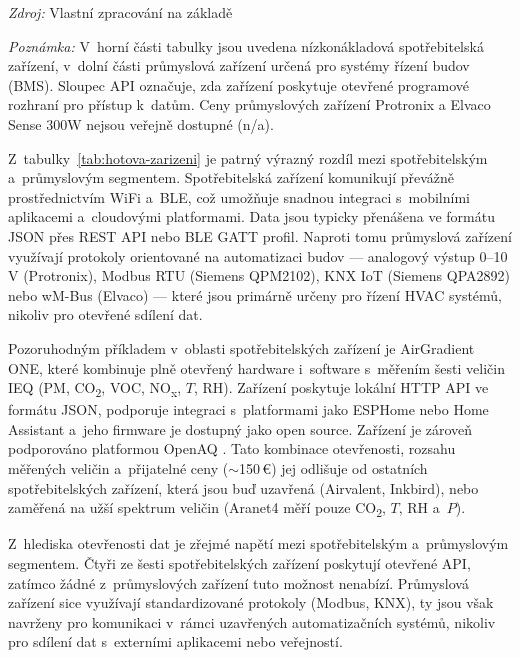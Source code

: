 {  \footnotesize \textit{Zdroj:} Vlastní zpracování na základě \parencite{Aranet4HOMEIndoor, PremiumBlackAirvalent, INKBIRDWireless4in1, protronixs.r.o.CidloNLECOCO2Cidla2020, protronixs.r.o.CidloNLECOTVOCCidla2020, siemensSensorOverviewBrochure2024, 2kshopsSiemensQPM2102MO2025, alpha-omegatechnologygmbh&co.ElvacoSense100W2025, alpha-omegatechnologygmbh&co.ElvacoSense300W2025, API}

  \footnotesize \textit{Poznámka:} V~horní části tabulky jsou uvedena nízkonákladová spotřebitelská zařízení, v~dolní části průmyslová zařízení určená pro systémy řízení budov (BMS). Sloupec API označuje, zda zařízení poskytuje otevřené programové rozhraní pro přístup k~datům. Ceny průmyslových zařízení Protronix a Elvaco Sense 300W nejsou veřejně dostupné (n/a).
}

Z~tabulky~\ref{tab:hotova-zarizeni} je patrný výrazný rozdíl mezi spotřebitelským a~průmyslovým segmentem. Spotřebitelská zařízení komunikují převážně prostřednictvím WiFi a~BLE, což umožňuje snadnou integraci s~mobilními aplikacemi a~cloudovými platformami. Data jsou typicky přenášena ve formátu JSON přes REST API nebo BLE GATT profil. Naproti tomu průmyslová zařízení využívají protokoly orientované na automatizaci budov --- analogový výstup 0--10\,V (Protronix), Modbus RTU (Siemens QPM2102), KNX IoT (Siemens QPA2892) nebo wM-Bus (Elvaco) --- které jsou primárně určeny pro řízení HVAC systémů, nikoliv pro otevřené sdílení dat.

Pozoruhodným příkladem v~oblasti spotřebitelských zařízení je AirGradient ONE, které kombinuje plně otevřený hardware i~software s~měřením šesti veličin IEQ (PM, CO\textsubscript{2}, VOC, NO\textsubscript{x}, $T$, RH). Zařízení poskytuje lokální HTTP API ve formátu JSON, podporuje integraci s~platformami jako ESPHome nebo Home Assistant a~jeho firmware je dostupný jako open source. Zařízení je zároveň podporováno platformou OpenAQ \parencite{API}. Tato kombinace otevřenosti, rozsahu měřených veličin a~přijatelné ceny (${\sim}$150\,€) jej odlišuje od ostatních spotřebitelských zařízení, která jsou buď uzavřená (Airvalent, Inkbird), nebo zaměřená na užší spektrum veličin (Aranet4 měří pouze CO\textsubscript{2}, $T$, RH a~$P$).

Z~hlediska otevřenosti dat je zřejmé napětí mezi spotřebitelským a~průmyslovým segmentem. Čtyři ze šesti spotřebitelských zařízení poskytují otevřené API, zatímco žádné z~průmyslových zařízení tuto možnost nenabízí. Průmyslová zařízení sice využívají standardizované protokoly (Modbus, KNX), ty jsou však navrženy pro komunikaci v~rámci uzavřených automatizačních systémů, nikoliv pro sdílení dat s~externími aplikacemi nebo veřejností.

